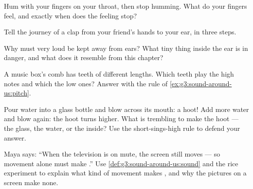 \begin{exercise}[$\star$]\label{exo:g3:sound-around-us:6}
Hum with your fingers on your throat, then stop humming. What do
your fingers feel, and exactly when does the feeling stop?
\end{exercise}

\begin{exercise}[$\star$]\label{exo:g3:sound-around-us:7}
Tell the journey of a clap from your friend's hands to your ear, in
three steps.
\end{exercise}

\begin{exercise}[$\star$]\label{exo:g3:sound-around-us:8}
Why must very loud  be kept away from ears? What tiny thing
inside the ear is in danger, and what does it resemble from this
chapter?
\end{exercise}

\begin{exercise}[$\star$]\label{exo:g3:sound-around-us:9}
A music box's comb has teeth of different lengths. Which teeth play
the high notes and which the low ones? Answer with the rule of
\cref{ex:g3:sound-around-us:pitch}.
\end{exercise}

\begin{exercise}[$\star\star$]\label{exo:g3:sound-around-us:10}
Pour water into a glass bottle and blow across its mouth: a hoot!
Add more water and blow again: the hoot turns higher. What is
trembling to make the hoot --- the glass, the water, or the 
inside? Use the short-sings-high rule to defend your answer.
\end{exercise}

\begin{exercise}[$\star\star$]\label{exo:g3:sound-around-us:11}
Maya says: ``When the television is on mute, the screen still moves
--- so movement alone must make .'' Use
\cref{def:g3:sound-around-us:sound} and the rice experiment to
explain what kind of movement makes , and why the pictures on
a screen make none.
\end{exercise}
